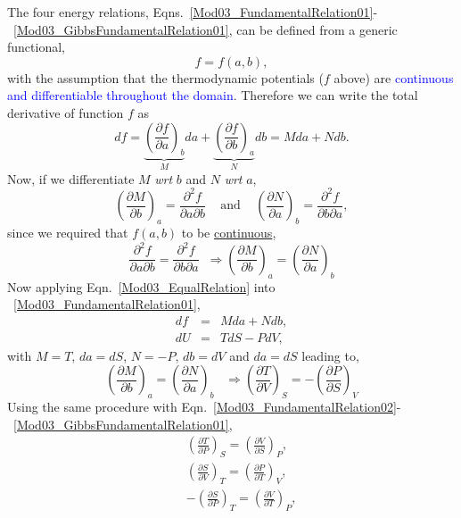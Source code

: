 \documentclass[12pts,a4paper,amsmath,amssymb,floatfix]{article}%
\newcommand{\frc}{\displaystyle\frac}
\newcommand{\blue}{\textcolor{blue}}
\newcommand{\wrt}{{\it wrt }}
\begin{document}
The four energy relations, Eqns.~\ref{Mod03_FundamentalRelation01}-~\ref{Mod03_GibbsFundamentalRelation01}, can be defined from a generic functional, 
   \begin{displaymath}
    f = f(a,b),
   \end{displaymath}
with the assumption that the thermodynamic potentials ($f$ above) are \blue{continuous and differentiable throughout the domain}. Therefore we can write the total derivative of function $f$ as
   \begin{displaymath}
         df = \underbrace{\left(\frc{\partial f}{\partial a}\right)_{b}}_{M}da + \underbrace{\left(\frc{\partial f}{\partial b}\right)_{a}}_{N}db = Mda + Ndb.
   \end{displaymath}
Now, if we differentiate $M$ \wrt $b$ and $N$ \wrt $a$,
   \begin{displaymath}
         \left(\frc{\partial M}{\partial b}\right)_{a} = \frc{\partial^{2}f}{\partial a\partial b} \;\;\;\text{ and }\;\;\; \left(\frc{\partial N}{\partial a}\right)_{b} = \frc{\partial^{2}f}{\partial b\partial a},
   \end{displaymath}
since we required that $f(a,b)$ to be \underline{continuous}, 
   \begin{equation}
         \frc{\partial^{2}f}{\partial a\partial b} = \frc{\partial^{2}f}{\partial b\partial a}\;\;\Longrightarrow \left(\frc{\partial M}{\partial b}\right)_{a} = \left(\frc{\partial N}{\partial a}\right)_{b}\label{Mod03_EqualRelation}
   \end{equation}
Now applying Eqn.~\ref{Mod03_EqualRelation} into ~\ref{Mod03_FundamentalRelation01},
   \begin{eqnarray}
        df &=& Mda + Ndb, \nonumber \\
        dU &=& TdS - PdV, \nonumber
   \end{eqnarray}
with $M=T$, $da=dS$, $N=-P$, $db = dV$ and $da = dS$ leading to,
   \begin{equation}
       \left(\frc{\partial M}{\partial b}\right)_{a} = \left(\frc{\partial N}{\partial a}\right)_{b} \;\;\;\Longrightarrow \left(\frc{\partial T}{\partial V}\right)_{S} = - \left(\frc{\partial P}{\partial S}\right)_{V}\label{Mod03_MaxwellRelation1}
   \end{equation}
Using the same procedure with  Eqn.~\ref{Mod03_FundamentalRelation02}-~\ref{Mod03_GibbsFundamentalRelation01},
   \begin{eqnarray}
          &&\left(\frc{\partial T}{\partial P}\right)_{S} = \left(\frc{\partial V}{\partial S}\right)_{P},\label{Mod03_MaxwellRelation2} \\
          &&\left(\frc{\partial S}{\partial V}\right)_{T} = \left(\frc{\partial P}{\partial T}\right)_{V},\label{Mod03_MaxwellRelation3} \\
          &&-\left(\frc{\partial S}{\partial P}\right)_{T} = \left(\frc{\partial V}{\partial T}\right)_{P},\label{Mod03_MaxwellRelation4} 
   \end{eqnarray}
\end{document}
